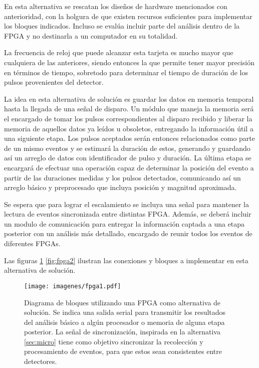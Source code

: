 \par En esta alternativa se rescatan los diseños de hardware mencionados con anterioridad, con la holgura de que existen recursos suficientes para implementar los bloques indicados. Incluso se evalúa incluir parte del análisis dentro de la FPGA y no destinarla a un computador en su totalidad.

\par La frecuencia de reloj que puede alcanzar esta tarjeta es mucho mayor que cualquiera de las anteriores, siendo entonces la que permite tener mayor precisión en términos de tiempo, sobretodo para determinar el tiempo de duración de los pulsos provenientes del detector.

\par La idea en esta alternativa de solución es guardar los datos en memoria temporal hasta la llegada de una señal de disparo. Un módulo que maneja la memoria será el encargado de tomar los pulsos correspondientes al disparo recibido y liberar la memoria de aquellos datos ya leídos u obsoletos, entregando la información útil a una siguiente etapa. Los pulsos aceptados serán entonces relacionados como parte de un mismo eventos y se estimará la duración de estos, generando y guardando así un arreglo de datos con identificador de pulso y duración. La última etapa se encargará de efectuar una operación capaz de determinar la posición del evento a partir de las duraciones medidas y los pulsos detectados, comunicando así un arreglo básico y preprocesado que incluya posición y magnitud aproximada.

\par Se espera que para lograr el escalamiento se incluya una señal para mantener la lectura de eventos sincronizada entre distintas FPGA. Además, se deberá incluir un modulo de comunicación para entregar la información captada a una etapa posterior con un análisis más detallado, encargado de reunir todos los eventos de diferentes FPGAs.

\newpage
\par Las figuras \ref{fig:fpga1} \ref{fig:fpga2} ilustran las conexiones y bloques a implementar en esta alternativa de solución.

\begin{figure}[H]
	\centering
	\texttt{[image: imagenes/fpga1.pdf]}
	\caption{Diagrama de bloques utilizando una FPGA como alternativa de solución. Se indica una salida serial para transmitir los resultados del análisis básico a algún procesador o memoria de alguna etapa posterior. La señal de sincronización, inspirada en la alternativa \ref{sec:micro} tiene como objetivo sincronizar la recolección y procesamiento de eventos, para que estos sean consistentes entre detectores.}
	\label{fig:fpga1}
\end{figure}

